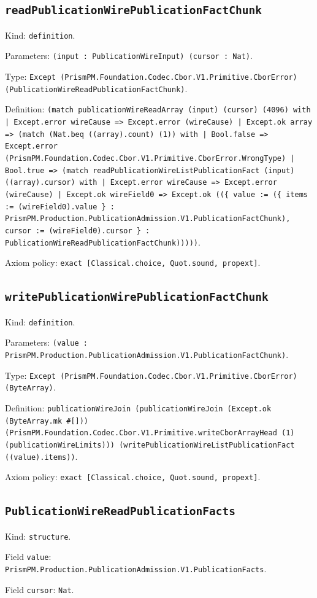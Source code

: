 \documentclass[11pt]{article}
\begin{document}
\subsection*{\texttt{readPublicationWirePublicationFactChunk}}
\noindent Kind: \texttt{definition}.\par
\noindent Parameters: \texttt{(input : PublicationWireInput) (cursor : Nat)}.\par
\noindent Type: \texttt{Except (PrismPM.Foundation.Codec.Cbor.V1.Primitive.CborError) (PublicationWireReadPublicationFactChunk)}.\par
\noindent Definition: \texttt{(match publicationWireReadArray (input) (cursor) (4096) with | Except.error wireCause => Except.error (wireCause) | Except.ok array => (match (Nat.beq ((array).count) (1)) with | Bool.false => Except.error (PrismPM.Foundation.Codec.Cbor.V1.Primitive.CborError.WrongType) | Bool.true => (match readPublicationWireListPublicationFact (input) ((array).cursor) with | Except.error wireCause => Except.error (wireCause) | Except.ok wireField0 => Except.ok ((\{ value := (\{ items := (wireField0).value \} : PrismPM.Production.PublicationAdmission.V1.PublicationFactChunk), cursor := (wireField0).cursor \} : PublicationWireReadPublicationFactChunk)))))}.\par
\noindent Axiom policy: \texttt{exact [Classical.choice, Quot.sound, propext]}.\par
\subsection*{\texttt{writePublicationWirePublicationFactChunk}}
\noindent Kind: \texttt{definition}.\par
\noindent Parameters: \texttt{(value : PrismPM.Production.PublicationAdmission.V1.PublicationFactChunk)}.\par
\noindent Type: \texttt{Except (PrismPM.Foundation.Codec.Cbor.V1.Primitive.CborError) (ByteArray)}.\par
\noindent Definition: \texttt{publicationWireJoin (publicationWireJoin (Except.ok (ByteArray.mk \#[])) (PrismPM.Foundation.Codec.Cbor.V1.Primitive.writeCborArrayHead (1) (publicationWireLimits))) (writePublicationWireListPublicationFact ((value).items))}.\par
\noindent Axiom policy: \texttt{exact [Classical.choice, Quot.sound, propext]}.\par
\subsection*{\texttt{PublicationWireReadPublicationFacts}}
\noindent Kind: \texttt{structure}.\par
\noindent Field \texttt{value}: \texttt{PrismPM.Production.PublicationAdmission.V1.PublicationFacts}.\par
\noindent Field \texttt{cursor}: \texttt{Nat}.\par
\end{document}
